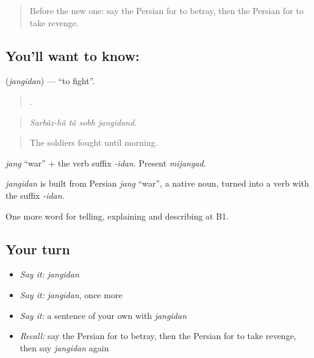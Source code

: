 \label{lesson:FA-C349-jangidan}



\begin{quote}
Before the new one: say the Persian for to betray, then the Persian for to take revenge.
\end{quote}

\subsection*{You'll want to know: }
\textbf{} (\emph{jangidan}) — \textquotedblleft{}to fight\textquotedblright{}.

\begin{quote}
   .
\end{quote}

\begin{quote}
\emph{Sarbâz-hâ tâ sobh jangidand.}
\end{quote}

\begin{quote}
The soldiers fought until morning.
\end{quote}

\emph{jang} \textquotedblleft{}war\textquotedblright{} + the verb suffix \emph{-idan}. Present \emph{mijangad}.

\begin{cousinweb}
\emph{jangidan} is built from Persian \emph{jang} \textquotedblleft{}war\textquotedblright{}, a native noun, turned into a verb with the suffix \emph{-idan}.
\end{cousinweb}

\begin{grammarlens}[title={What you've built}]
One more word for telling, explaining and describing at B1.
\end{grammarlens}

\subsection*{Your turn}
\begin{itemize}
\raggedright
  \item \emph{Say it:} \emph{jangidan}
  \item \emph{Say it:} \emph{jangidan}, once more
  \item \emph{Say it:} a sentence of your own with \emph{jangidan}
  \item \emph{Recall:} say the Persian for to betray, then the Persian for to take revenge, then say \emph{jangidan} again
\end{itemize}

